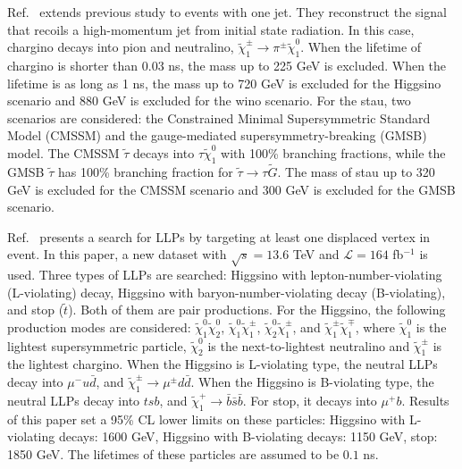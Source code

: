 \documentclass[a4paper,11pt]{article}
\begin{document}
Ref.~\cite{ATLAS:2026hnb} extends previous study to events with one jet.
They reconstruct the signal that recoils a high-momentum jet from initial state radiation. 
In this case, chargino decays into pion and neutralino, $\tilde{\chi}^\pm_1\to\pi^\pm\tilde{\chi}^0_1$.
When the lifetime of chargino is shorter than 0.03 ns, the mass up to 225 GeV is excluded. 
When the lifetime is as long as 1 ns, the mass up to 720 GeV is excluded for the Higgsino scenario and 880 GeV is excluded for the wino scenario. 
For the stau, two scenarios are considered: the Constrained Minimal Supersymmetric Standard Model (CMSSM) and the gauge-mediated supersymmetry-breaking (GMSB) model.
The CMSSM $\tilde{\tau}$ decays into $\tau\tilde{\chi}^0_1$ with 100\% branching fractions, while the GMSB $\tilde{\tau}$ has 100\% branching fraction for $\tilde{\tau}\to \tau\tilde{G}$. 
The mass of stau up to 320 GeV is excluded for the CMSSM scenario and 300 GeV is excluded for the GMSB scenario.

Ref.~\cite{ATLAS:2026aej} presents a search for LLPs by targeting at least one displaced vertex in event. 
In this paper, a new dataset with $\sqrt{s}=13.6$ TeV and $\mathcal{L}=164$ fb$^{-1}$ is used.
Three types of LLPs are searched: Higgsino with lepton-number-violating (L-violating) decay, 
Higgsino with baryon-number-violating decay (B-violating), 
and stop ($\tilde{t}$).
Both of them are pair productions. 
For the Higgsino, the following production modes are considered: $\tilde{\chi}^0_1\tilde{\chi}^0_2$, $\tilde{\chi}^0_1\tilde{\chi}^\pm_1$, $\tilde{\chi}^0_2\tilde{\chi}^\pm_1$,
and $\tilde{\chi}^\pm_1\tilde{\chi}^\mp_1$,
where $\tilde{\chi}^0_1$ is the lightest supersymmetric particle, 
$\tilde{\chi}^0_2$ is the next-to-lightest neutralino and $\tilde{\chi}^\pm_1$ is the lightest chargino.
When the Higgsino is L-violating type, the neutral LLPs decay into $\mu^-u\bar{d}$, and $\tilde{\chi}^\pm_1\to \mu^\pm d\bar{d}$.
When the Higgsino is B-violating type, the neutral LLPs decay into $tsb$, and $\tilde{\chi}^+_1\to \bar{b}\bar{s}\bar{b}$.
For stop, it decays into $\mu^+b$.
Results of this paper set a 95\% CL lower limits on these particles:
Higgsino with L-violating decays: 1600 GeV, 
Higgsino with B-violating decays: 1150 GeV,
stop: 1850 GeV.
The lifetimes of these particles are assumed to be $0.1$ ns.
\end{document}
